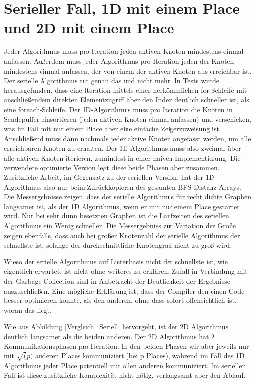 \section{Serieller Fall, 1D mit einem Place und 2D mit einem Place} %
\label{sec:serieller_fall_vs_1d_mit_einem_place}
Jeder Algorithmus muss pro Iteration jeden aktiven Knoten mindestens einmal anfassen. Außerdem muss jeder Algorithmus pro Iteration jeden der Knoten mindestens einmal anfassen, der von einem der aktiven Knoten aus erreichbar ist. Der serielle Algorithmus tut genau das und nicht mehr. In Tests wurde herausgefunden, dass eine Iteration mittels einer herkömmlichen for-Schleife mit anschließendem direkten Elementzugriff über den Index deutlich schneller ist, als eine foreach-Schleife. Der 1D-Algorithmus muss pro Iteration die Knoten in Sendepuffer einsortieren (jeden aktiven Knoten einmal anfassen) und verschicken, was im Fall mit nur einem Place aber eine einfache Zeigerzuweisung ist. Anschließend muss dann nochmals jeder aktive Knoten angefasst werden, um alle erreichbaren Knoten zu erhalten. Der 1D-Algorithmus muss also zweimal über alle aktiven Knoten iterieren, zumindest in einer naiven Implementierung. Die verwendete optimierte Version legt diese beide Phasen aber zusammen. Zusätzliche Arbeit, im Gegensatz zu der seriellen Version, hat der 1D Algorithmus also nur beim Zurückkopieren des gesamten BFS-Distanz-Arrays. Die Messergebnisse zeigen, dass der serielle Algorithmus für recht dichte Graphen langsamer ist, als der 1D Algorithmus, wenn er mit nur einem Place gestartet wird. Nur bei sehr dünn besetzten Graphen ist die Laufzeiten des seriellen Algorithmus ein Wenig schneller. Die Messergebniss zur Variation der Größe zeigen ebenfalls, dass auch bei großer Knotenzahl der serielle Algorithmus der schnellste ist, solange der durchschnittliche Knotengrad nicht zu groß wird.

Wieso der serielle Algorithmus auf Listenbasis nicht der schnellste ist, wie eigentlich erwartet, ist nicht ohne weiteres zu erklären. Zufall in Verbindung mit der Garbage Collection sind in Anbetracht der Deutlichkeit der Ergebnisse auszuschließen. Eine mögliche Erklärung ist, dass der Compiler den einen Code besser optimieren konnte, als den anderen, ohne dass sofort offensichtlich ist, woran das liegt.

Wie aus Abbildung \ref{Vergleich_Seriell} hervorgeht, ist der 2D Algorithmus deutlich langsamer als die beiden anderen. Der 2D Algorithmus hat 2 Kommunikationsphasen pro Iteration. In den beiden Phasen wir aber jeweils nur mit $\sqrt(p)$ anderen Places kommuniziert (bei p Places)\cite{Buluc:2011}, während im Fall des 1D Algorithmus jeder Place potentiell mit allen anderen kommuniziert. Im seriellen Fall ist diese zusätzliche Komplexität nicht nötig, verlangsamt aber den Ablauf.

